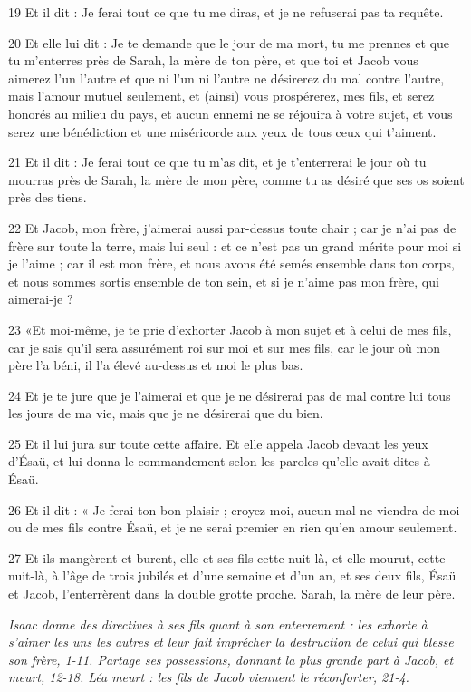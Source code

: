 \par 19 Et il dit : Je ferai tout ce que tu me diras, et je ne refuserai pas ta requête.
\par 20 Et elle lui dit : Je te demande que le jour de ma mort, tu me prennes et que tu m'enterres près de Sarah, la mère de ton père, et que toi et Jacob vous aimerez l'un l'autre et que ni l'un ni l'autre ne désirerez du mal contre l'autre, mais l'amour mutuel seulement, et (ainsi) vous prospérerez, mes fils, et serez honorés au milieu du pays, et aucun ennemi ne se réjouira à votre sujet, et vous serez une bénédiction et une miséricorde aux yeux de tous ceux qui t'aiment.
\par 21 Et il dit : Je ferai tout ce que tu m'as dit, et je t'enterrerai le jour où tu mourras près de Sarah, la mère de mon père, comme tu as désiré que ses os soient près des tiens.
\par 22 Et Jacob, mon frère, j'aimerai aussi par-dessus toute chair ; car je n'ai pas de frère sur toute la terre, mais lui seul : et ce n'est pas un grand mérite pour moi si je l'aime ; car il est mon frère, et nous avons été semés ensemble dans ton corps, et nous sommes sortis ensemble de ton sein, et si je n'aime pas mon frère, qui aimerai-je ?
\par 23 «Et moi-même, je te prie d'exhorter Jacob à mon sujet et à celui de mes fils, car je sais qu'il sera assurément roi sur moi et sur mes fils, car le jour où mon père l'a béni, il l'a élevé au-dessus et moi le plus bas.
\par 24 Et je te jure que je l'aimerai et que je ne désirerai pas de mal contre lui tous les jours de ma vie, mais que je ne désirerai que du bien.
\par 25 Et il lui jura sur toute cette affaire. Et elle appela Jacob devant les yeux d'Ésaü, et lui donna le commandement selon les paroles qu'elle avait dites à Ésaü.
\par 26 Et il dit : « Je ferai ton bon plaisir ; croyez-moi, aucun mal ne viendra de moi ou de mes fils contre Ésaü, et je ne serai premier en rien qu'en amour seulement.
\par 27 Et ils mangèrent et burent, elle et ses fils cette nuit-là, et elle mourut, cette nuit-là, à l'âge de trois jubilés et d'une semaine et d'un an, et ses deux fils, Ésaü et Jacob, l'enterrèrent dans la double grotte proche. Sarah, la mère de leur père.


\par \textit{Isaac donne des directives à ses fils quant à son enterrement : les exhorte à s'aimer les uns les autres et leur fait imprécher la destruction de celui qui blesse son frère, 1-11. Partage ses possessions, donnant la plus grande part à Jacob, et meurt, 12-18. Léa meurt : les fils de Jacob viennent le réconforter, 21-4.}

